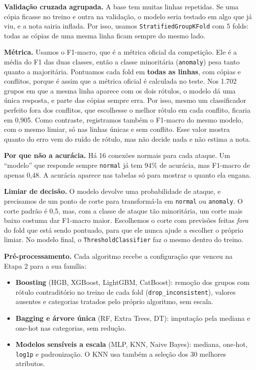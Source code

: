 \documentclass[11pt,a4paper]{article}
\begin{document}
\textbf{Validação cruzada agrupada.} A base tem muitas linhas repetidas. Se uma cópia ficasse no treino e outra na validação, o modelo seria testado em algo que já viu, e a nota sairia inflada. Por isso, usamos \texttt{StratifiedGroupKFold} com 5 folds: todas as cópias de uma mesma linha ficam sempre do mesmo lado.

\textbf{Métrica.} Usamos o F1-macro, que é a métrica oficial da competição. Ele é a média do F1 das duas classes, então a classe minoritária (\texttt{anomaly}) pesa tanto quanto a majoritária. Pontuamos cada fold em \textbf{todas as linhas}, com cópias e conflitos, porque é assim que a métrica oficial é calculada no teste. Nos 1.702 grupos em que a mesma linha aparece com os dois rótulos, o modelo dá uma única resposta, e parte das cópias sempre erra. Por isso, mesmo um classificador perfeito fora dos conflitos, que escolhesse o melhor rótulo em cada conflito, ficaria em 0,905. Como contraste, registramos também o F1-macro do mesmo modelo, com o mesmo limiar, só nas linhas únicas e sem conflito. Esse valor mostra quanto do erro vem do ruído de rótulo, mas não decide nada e não estima a nota.

\textbf{Por que não a acurácia.} Há 16 conexões normais para cada ataque. Um ``modelo'' que responde sempre \texttt{normal} já tem 94\% de acurácia, mas F1-macro de apenas 0,48. A acurácia aparece nas tabelas só para mostrar o quanto ela engana.

\textbf{Limiar de decisão.} O modelo devolve uma probabilidade de ataque, e precisamos de um ponto de corte para transformá-la em \texttt{normal} ou \texttt{anomaly}. O corte padrão é 0,5, mas, com a classe de ataque tão minoritária, um corte mais baixo costuma dar F1-macro maior. Escolhemos o corte com previsões feitas \emph{fora} do fold que está sendo pontuado, para que ele nunca ajude a escolher o próprio limiar. No modelo final, o \texttt{ThresholdClassifier} faz o mesmo dentro do treino.

\textbf{Pré-processamento.} Cada algoritmo recebe a configuração que venceu na Etapa 2 para a sua família:
\begin{itemize}
\item \textbf{Boosting} (HGB, XGBoost, LightGBM, CatBoost): remoção dos grupos com rótulo contraditório no treino de cada fold (\texttt{drop\_inconsistent}), valores ausentes e categorias tratados pelo próprio algoritmo, sem escala.
\item \textbf{Bagging e árvore única} (RF, Extra Trees, DT): imputação pela mediana e one-hot nas categorias, sem redução.
\item \textbf{Modelos sensíveis a escala} (MLP, KNN, Naive Bayes): mediana, one-hot, \texttt{log1p} e padronização. O KNN usa também a seleção dos 30 melhores atributos.
\end{itemize}
\end{document}
